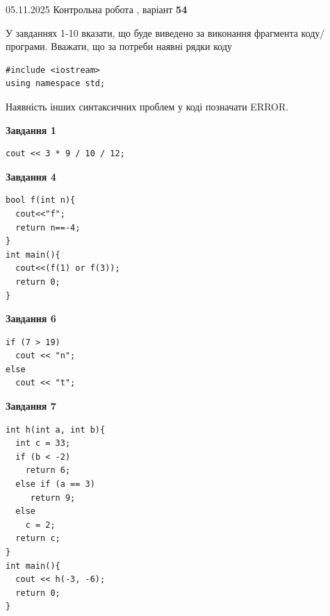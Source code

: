 \documentclass[12pt, ukrainian]{article}
\begin{document}
\newpage

{\Large{05.11.2025 Контрольна робота , варіант  \No \textbf { 54 }\par}}
{
\begin {large}
У завданнях 1-10 вказати, що буде виведено за виконання фрагмента коду/про\-гра\-ми.
Вважати, що за потреби наявні рядки коду
\begin{verbatim}
#include <iostream>
using namespace std;
\end{verbatim}
Наявність інших синтаксичних проблем у коді позначати ERROR.

\begin{minipage}[t]{7.0cm}

\begin{center}
\textbf{Завдання 1}
\end{center}
\vspace{-8mm}

\begin{verbatim}
cout << 3 * 9 / 10 / 12;
\end{verbatim}



\begin{center}
\textbf{Завдання 4}
\end{center}
\vspace{-8mm}

\begin{verbatim}
bool f(int n){
  cout<<"f";
  return n==-4;
}
int main(){
  cout<<(f(1) or f(3));
  return 0;
}
\end{verbatim}



\begin{center}
\textbf{Завдання 6}
\end{center}
\vspace{-8mm}

\begin{verbatim}
if (7 > 19)
  cout << "n";
else
  cout << "t";
\end{verbatim}



\begin{center}
\textbf{Завдання 7}
\end{center}
\vspace{-8mm}

\begin{verbatim}
int h(int a, int b){
  int c = 33;
  if (b < -2)
    return 6;
  else if (a == 3)
     return 9;
  else
    c = 2;
  return c;
}
int main(){
  cout << h(-3, -6);
  return 0;
}
\end{verbatim}


\end{minipage}
\end{large}}
\end{document}
